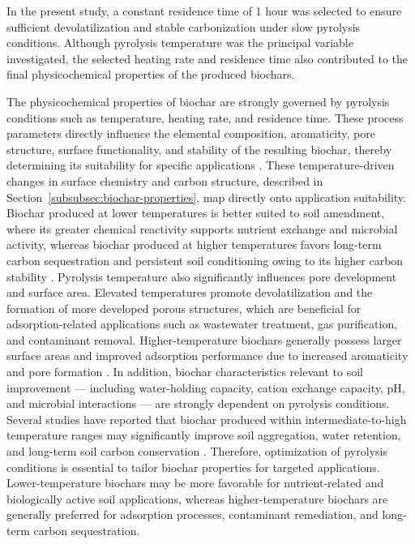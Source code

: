 \vspace{0.3em}

In the present study, a constant residence time of 1 hour was selected to ensure sufficient devolatilization and stable carbonization under slow pyrolysis conditions. Although pyrolysis temperature was the principal variable investigated, the selected heating rate and residence time also contributed to the final physicochemical properties of the produced biochars. 

\vspace{0.3em}

The physicochemical properties of biochar are strongly governed by pyrolysis conditions such as temperature, heating rate, and residence time. These process parameters directly influence the elemental composition, aromaticity, pore structure, surface functionality, and stability of the resulting biochar, thereby determining its suitability for specific applications \cite{luo-2024,tomczyk-2020}.
These temperature-driven changes in surface chemistry and carbon structure, described in Section~\ref{subsubsec:biochar-properties}, map directly onto application suitability. Biochar produced at lower temperatures is better suited to soil amendment, where its greater chemical reactivity supports nutrient exchange and microbial activity, whereas biochar produced at higher temperatures favors long-term carbon sequestration and persistent soil conditioning owing to its higher carbon stability \cite{lu-2021,nogues-2023,pokharel-2025}.
Pyrolysis temperature also significantly influences pore development and surface area. Elevated temperatures promote devolatilization and the formation of more developed porous structures, which are beneficial for adsorption-related applications such as wastewater treatment, gas purification, and contaminant removal. Higher-temperature biochars generally possess larger surface areas and improved adsorption performance due to increased aromaticity and pore formation \cite{loebsack-2025,luo-2024}.
In addition, biochar characteristics relevant to soil improvement — including water-holding capacity, cation exchange capacity, pH, and microbial interactions — are strongly dependent on pyrolysis conditions. Several studies have reported that biochar produced within intermediate-to-high temperature ranges may significantly improve soil aggregation, water retention, and long-term soil carbon conservation \cite{ghorbani-2022,kabir-2023,shyam-2025}.
Therefore, optimization of pyrolysis conditions is essential to tailor biochar properties for targeted applications. Lower-temperature biochars may be more favorable for nutrient-related and biologically active soil applications, whereas higher-temperature biochars are generally preferred for adsorption processes, contaminant remediation, and long-term carbon sequestration.

